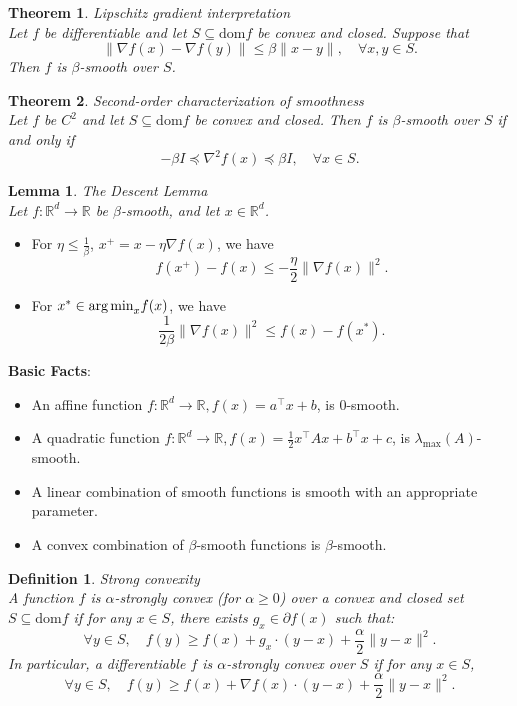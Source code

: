 \documentclass[11pt]{book} %
\newtheorem{theorem}{Theorem}[section]
\newtheorem{lemma}{Lemma}[section]
\newtheorem{definition}{Definition}[section]
\begin{document}
\begin{theorem} {Lipschitz gradient interpretation } \\
Let \( f \) be differentiable and let \( S \subseteq \text{dom} f \) be convex and closed. Suppose that
\[\|\nabla f(x) - \nabla f(y)\| \leq \beta \|x - y\|, \quad \forall x, y \in S.\]
Then \( f \) is \(\beta\)-smooth over \( S \).
\end{theorem}

\begin{theorem} {Second-order characterization of smoothness} \\
Let \( f \) be \( C^2 \) and let \( S \subseteq \text{dom} f \) be convex and closed. Then \( f \) is \(\beta\)-smooth over \( S \) if and only if
\[-\beta I \preceq \nabla^2 f(x) \preceq \beta I, \quad \forall x \in S.\]
\end{theorem}


\begin {lemma} {The Descent Lemma} \\
Let \( f : \mathbb{R}^d \rightarrow \mathbb{R} \) be \(\beta\)-smooth, and let \( x \in \mathbb{R}^d \).
\end{lemma}

\begin{itemize}
    \item For \( \eta \leq \frac{1}{\beta} \), \( x^{+} = x - \eta \nabla f(x) \), we have
    \[ f(x^{+}) - f(x) \leq -\frac{\eta}{2} \|\nabla f(x)\|^2. \]
    \item For \( x^{*} \in \text{arg\,min}_x f(x) \), we have
    \[ \frac{1}{2\beta} \|\nabla f(x)\|^2 \leq f(x) - f(x^{*}). \]
\end{itemize}

\textbf{Basic Facts}:
\begin{itemize}
    \item An affine function \( f : \mathbb{R}^d \rightarrow \mathbb{R}, f(x) = a^\top x + b \), is 0-smooth.
    \item A quadratic function \( f : \mathbb{R}^d \rightarrow \mathbb{R}, f(x) = \frac{1}{2} x^\top A x + b^\top x + c \), is \( \lambda_{\text{max}}(A) \)-smooth.
    \item A linear combination of smooth functions is smooth with an appropriate parameter.
    \item A convex combination of \(\beta\)-smooth functions is \(\beta\)-smooth.
\end{itemize}


\begin{definition} {Strong convexity} \\
A function \( f \) is \(\alpha\)-strongly convex (for \(\alpha \geq 0\)) over a convex and closed set \( S \subseteq \text{dom} f \) if for any \( x \in S \), there exists \( g_x \in \partial f(x) \) such that:
\[
\forall y \in S, \quad f(y) \geq f(x) + g_x \cdot (y - x) + \frac{\alpha}{2} \|y - x\|^2.
\]
In particular, a differentiable \( f \) is \(\alpha\)-strongly convex over \( S \) if for any \( x \in S \),
\[
\forall y \in S, \quad f(y) \geq f(x) + \nabla f(x) \cdot (y - x) + \frac{\alpha}{2} \|y - x\|^2.
\]
\end{definition}
\end{document}
